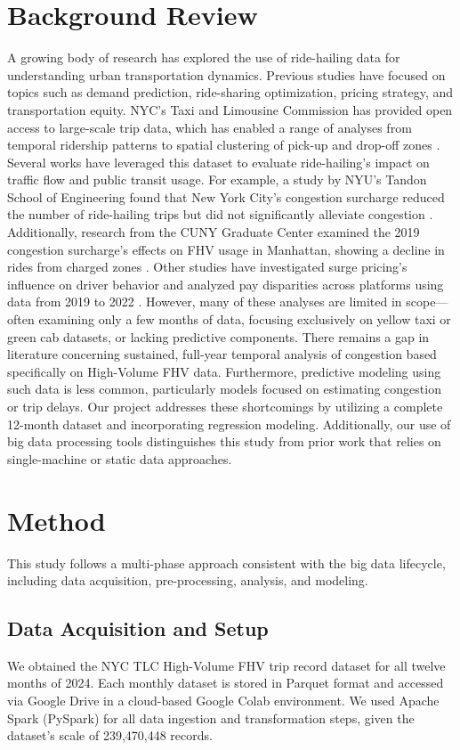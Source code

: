 \documentclass{article}
\begin{document}
\section{Background Review}

A growing body of research has explored the use of ride-hailing data for understanding urban transportation dynamics. Previous studies have focused on topics such as demand prediction, ride-sharing optimization, pricing strategy, and transportation equity. NYC’s Taxi and Limousine Commission has provided open access to large-scale trip data, which has enabled a range of analyses from temporal ridership patterns to spatial clustering of pick-up and drop-off zones \cite{nyctlc2023}.
Several works have leveraged this dataset to evaluate ride-hailing’s impact on traffic flow and public transit usage. For example, a study by NYU's Tandon School of Engineering found that New York City’s congestion surcharge reduced the number of ride-hailing trips but did not significantly alleviate congestion \cite{nyu2023}. Additionally, research from the CUNY Graduate Center examined the 2019 congestion surcharge’s effects on FHV usage in Manhattan, showing a decline in rides from charged zones \cite{cuny2023}.
Other studies have investigated surge pricing’s influence on driver behavior \cite{surgepricing2022} and analyzed pay disparities across platforms using data from 2019 to 2022 \cite{ucla2023}. However, many of these analyses are limited in scope—often examining only a few months of data, focusing exclusively on yellow taxi or green cab datasets, or lacking predictive components.
There remains a gap in literature concerning sustained, full-year temporal analysis of congestion based specifically on High-Volume FHV data. Furthermore, predictive modeling using such data is less common, particularly models focused on estimating congestion or trip delays. Our project addresses these shortcomings by utilizing a complete 12-month dataset and incorporating regression modeling. Additionally, our use of big data processing tools distinguishes this study from prior work that relies on single-machine or static data approaches.

\section{Method}
This study follows a multi-phase approach consistent with the big data lifecycle, including data acquisition, pre-processing, analysis, and modeling.

\subsection{Data Acquisition and Setup}
We obtained the NYC TLC High-Volume FHV trip record dataset for all twelve months of 2024. Each monthly dataset is stored in Parquet format and accessed via Google Drive in a cloud-based Google Colab environment. We used Apache Spark (PySpark) for all data ingestion and transformation steps, given the dataset's scale of 239,470,448 records.
\end{document}
